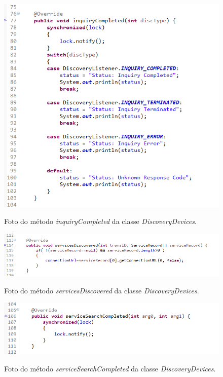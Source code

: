 \begin{figure}[!ht]
\centering
\caption{Foto do método \textit{inquiryCompleted} da classe \textit{DiscoveryDevices}.} 
{\includegraphics[scale=.80]{imagens/pacoteBluetooth-DiscoveryDevices_inquiryCompleted.png}}\\
 \label{Fig:inquiry_completed}
\end{figure}

\begin{figure}[!ht]
\centering
\caption{Foto do método \textit{servicesDiscovered} da classe \textit{DiscoveryDevices}.} 
{\includegraphics[scale=.78]{imagens/pacoteBluetooth-DiscoveryDevices_servicesDiscovered.png}}\\
 \label{Fig:services_discovered}
\end{figure}

\begin{figure}[!ht]
\centering
\caption{Foto do método \textit{serviceSearchCompleted} da classe \textit{DiscoveryDevices}.} 
{\includegraphics[scale=.78]{imagens/pacoteBluetooth-DiscoveryDevices_serviceSearchCompleted.png}}\\
 \label{Fig:service_search_completed}
\end{figure}

